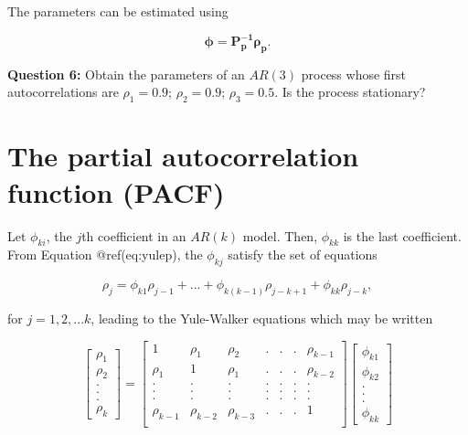 \documentclass[
  11pt,
  a4paper,
]{report}
\begin{document}
The parameters can be estimated using

\[\bm{\phi}=\bm{P_p^{-1}\rho_p}.\]

\textbf{Question 6:} Obtain the parameters of an \(AR(3)\) process whose
first autocorrelations are \(\rho_1=0.9\); \(\rho_2=0.9\);
\(\rho_3=0.5\). Is the process stationary?

\section{The partial autocorrelation function
(PACF)}\label{the-partial-autocorrelation-function-pacf}

Let \(\phi_{ki}\), the \(j\)th coefficient in an \(AR(k)\) model. Then,
\(\phi_{kk}\) is the last coefficient. From Equation @ref(eq:yulep), the
\(\phi_{kj}\) satisfy the set of equations

\begin{equation}
\label{eq:pacf}
\rho_j=\phi_{k1}\rho_{j-1}+...+\phi_{k(k-1)}\rho_{j-k+1}+\phi_{kk}\rho_{j-k},
\end{equation}

for \(j=1, 2, ...k\), leading to the Yule-Walker equations which may be
written

\begin{equation}
\label{eq:pacf}
\left[\begin{array}
{r}
\rho_1  \\
\rho_2  \\
.\\
.\\
.\\
\rho_k
\end{array}\right] = \left[\begin{array}
{rrrrrrr}
1 & \rho_1 & \rho_2 & .&.&.& \rho_{k-1} \\
\rho_1 & 1 & \rho_1 & .&.&.& \rho_{k-2} \\
. & . & . & .&.&.& . \\
. & . & . & .&.&.& . \\
. & . & . & .&.&.& . \\
\rho_{k-1} & \rho_{k-2} & \rho_{k-3} & .&.&.& 1 \\
\end{array}\right] \left[\begin{array}
{r}
\phi_{k1}  \\
\phi_{k2}  \\
.\\
.\\
.\\
\phi_{kk}
\end{array}\right]
\end{equation}
\end{document}

